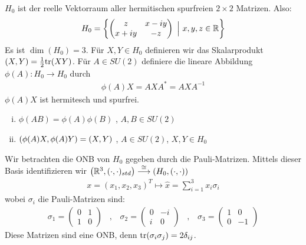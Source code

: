 \begin{definition}[$H_0$]
    $H_0$ ist der reelle Vektorraum aller hermitischen spurfreien $2 \times 2$
    Matrizen. Also:
    \begin{align*}
        H_0 = \left\{ 
            \begin{pmatrix}
                z & x - i y \\ x + i y & -z
            \end{pmatrix}
            \ \Big| \ x,y,z \in \mathbb{R}
         \right\}
    \end{align*}
    Es ist $\dim(H_0) = 3$. Für $X,Y \in H_0$ definieren wir das Skalarprodukt
    $(X,Y) = \frac{1}{2} \text{tr}(XY)$. Für $A \in SU(2)$ definiere die lineare
    Abbildung $\phi(A) : H_0 \rightarrow H_0$ durch
    \begin{align*}
        \phi(A) X = A X A^\ast = A X A^{-1}
    \end{align*}
    $\phi(A)X$ ist hermitesch und spurfrei.
\end{definition}

\begin{satz}
    \begin{enumerate}[(i)]
        \item $\phi(AB) = \phi(A) \phi(B)$ , $A,B \in SU(2)$
        \item $\left( \phi(A)X,\phi(A)Y \right) = \left( X,Y \right)$ , $A \in SU(2)$, $X,Y \in H_0$
    \end{enumerate}
\end{satz}

Wir betrachten die ONB von $H_0$ gegeben durch die Pauli-Matrizen. Mittels
dieser Basis identifizieren wir $\left( \mathbb{R}^3 , (\cdot,\cdot)_{std} \right)
\stackrel{\cong}{\longrightarrow} \left( H_0,(\cdot,\cdot) \right)$
\begin{align*}
    x = (x_1,x_2,x_3)^T \mapsto \hat{x} = \sum_{i=1}^3 x_i \sigma_i
\end{align*}
wobei $\sigma_i$ die Pauli-Matrizen sind:
\begin{align*}
    \sigma_1 = \begin{pmatrix}
        0 & 1 \\ 1 & 0
    \end{pmatrix}
    \hspace{10pt} , \hspace{10pt}
    \sigma_2 = \begin{pmatrix}
        0 & -i \\ i & 0
    \end{pmatrix}
    \hspace{10pt} , \hspace{10pt}
    \sigma_3 = \begin{pmatrix}
        1 & 0 \\ 0 & -1
    \end{pmatrix}
\end{align*}
Diese Matrizen sind eine ONB, denn $\text{tr}(\sigma_i \sigma_j) = 2 \delta_{ij}$.

